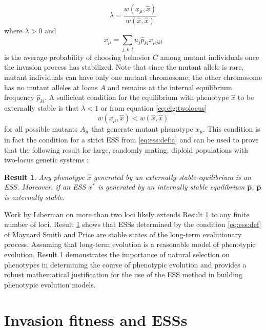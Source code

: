 \documentclass[11pt]{article}
\newcommand{\ess}[1]{#1^*}
\newcommand{\fixp}[1]{\hat{#1}}
\renewcommand{\vec}[1]{\symbf{#1}}
\newcommand{\mut}{\mu}
\newcommand{\eig}{\lambda}
\newtheorem{result}{Result}
\begin{document}
\begin{equation}
  \label{eq:eig:twolocus}
  \eig = \frac{w(x_{\mut}, \fixp{x})}{w(\fixp{x}, \fixp{x})}
\end{equation}
where $\eig>0$ and
\begin{equation}
  \label{eq:mut:pheno:twolocus}
  x_{\mut} = \sum_{j,k,l} u_{j} \fixp{p}_{kl} x_{\mut jkl}
\end{equation}
is the average probability of choosing behavior $C$ among mutant individuals once the invasion process has stabilized. Note that since the mutant allele is rare, mutant individuals can have only one mutant chromosome; the other chromosome has no mutant alleles at locus $A$ and remains at the internal equilibrium frequency $\fixp{p}_{kl}$. A sufficient condition for the equilibrium with phenotype $\fixp{x}$ to be externally stable is that $\eig < 1$ or from equation \eqref{eq:eig:twolocus}
\begin{equation*}
  w(x_{\mut}, \fixp{x}) < w(\fixp{x}, \fixp{x})
\end{equation*}
for all possible mutants $A_{\mut}$ that generate mutant phenotype $x_{\mut}$. This condition is in fact the condition for a strict ESS from \eqref{eq:ess:def:a} and can be used to prove that the following result for large, randomly mating, diploid populations with two-locus genetic systems \cite{Eshel:Feldman:1984,Eshel:1996,Eshel:Feldman:1998}:
\begin{result}
  \label{res:twolocus}
  Any phenotype $\fixp{x}$ generated by an externally stable equilibrium is an ESS. Moreover, if an ESS $\ess{x}$ is generated by an internally stable equilibrium $\fixp{\vec{p}}$, $\fixp{\vec{p}}$ is externally stable.
\end{result}
\noindent
Work by Liberman \cite{Liberman:1988} on more than two loci likely extends Result \ref{res:twolocus} to any finite number of loci. Result \ref{res:twolocus} shows that ESSs determined by the condition \eqref{eq:ess:def} of Maynard Smith and Price \cite{Maynard-Smith:Price:1973,Maynard-Smith:1974} are stable states of the long-term evolutionary process. Assuming that long-term evolution is a reasonable model of phenotypic evolution, Result \ref{res:twolocus} demonstrates the importance of natural selection on phenotypes in determining the course of phenotypic evolution and provides a robust mathematical justification for the use of the ESS method in building phenotypic evolution models.

\section{Invasion fitness and ESSs}
\end{document}
